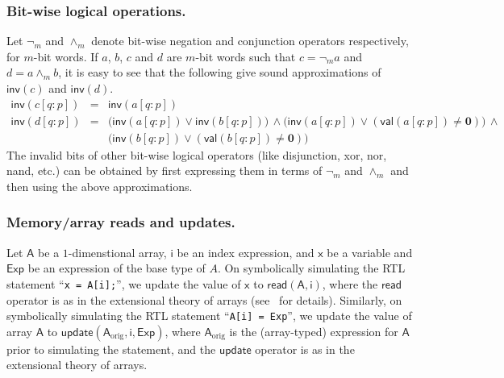 \documentclass{llncs}
\newcommand{\val}{\ensuremath{\mathsf{val}}}
\newcommand{\inv}{\ensuremath{\mathsf{inv}}}
\newcommand{\arread}{\ensuremath{\mathsf{read}}}
\newcommand{\arupdate}{\ensuremath{\mathsf{update}}}
\begin{document}
\subsubsection{Bit-wise logical operations.} Let $\neg_m$
and $\wedge_m$ denote bit-wise negation and conjunction operators
respectively, for $m$-bit words.  If $a$, $b$, $c$ and $d$ are $m$-bit
words such that $c = \neg_m a$ and $d = a \wedge_m b$, it is easy to
see that the following give sound approximations of ${\inv}(c)$ and
${\inv}(d)$.
\begin{eqnarray}
{\inv}(c[q:p]) & = & {\inv}(a[q:p]) \nonumber \\{\inv}(d[q:p]) & = & \big({\inv}(a[q:p]) \vee {\inv}(b[q:p])\big) \,\wedge \big({\inv}(a[q:p]) \vee ({\val}(a[q:p]) \neq \mathbf{0})\big)\,\wedge\,\nonumber\\
& & \big({\inv}(b[q:p]) \vee ({\val}(b[q:p]) \neq \mathbf{0})\big)\nonumber \end{eqnarray}
The invalid bits of other bit-wise logical operators (like
disjunction, xor, nor, nand, etc.) can be obtained by first expressing
them in terms of $\neg_m$ and $\wedge_m$ and then using the above
approximations.


\subsubsection{Memory/array reads and updates.} Let
$\mathsf{A}$ be a $1$-dimenstional array, $\mathsf{i}$ be an index
expression, and $\mathsf{x}$ be a variable and $\mathsf{Exp}$ be an
expression of the base type of $A$.  On symbolically simulating the
RTL statement ``{\tt x = A[i];}'', we update the value of $\mathsf{x}$
to ${\arread}(\mathsf{A}, \mathsf{i})$, where the ${\arread}$ operator
is as in the extensional theory of arrays
(see~\cite{StumpBarrettDill01} for details).  Similarly, on
symbolically simulating the RTL statement ``{\tt A[i] = Exp}'', we
update the value of array $\mathsf{A}$ to
${\arupdate}(\mathsf{A}_{\text{orig}}, \mathsf{i}, \mathsf{Exp})$,
where $\mathsf{A}_{\text{orig}}$ is the (array-typed) expression for
$\mathsf{A}$ prior to simulating the statement, and the ${\arupdate}$
operator is as in the extensional theory of arrays. 
\end{document}
